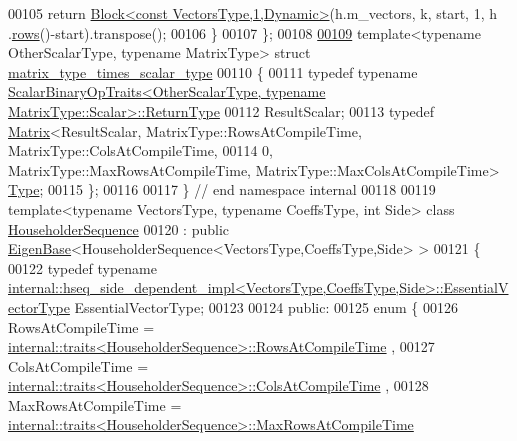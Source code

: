 \begin{DoxyCode}
00105     \textcolor{keywordflow}{return} \hyperlink{group___core___module_class_eigen_1_1_block}{Block<const VectorsType,1,Dynamic>}(h.m\_vectors, k, start, 1, h
      .\hyperlink{group___householder___module_a6eaafe2460930d1f4aa67d6e577b71f0}{rows}()-start).transpose();
00106   \}
00107 \};
00108 
\hyperlink{struct_eigen_1_1internal_1_1matrix__type__times__scalar__type}{00109} \textcolor{keyword}{template}<\textcolor{keyword}{typename} OtherScalarType, \textcolor{keyword}{typename} MatrixType> \textcolor{keyword}{struct }
      \hyperlink{struct_eigen_1_1internal_1_1matrix__type__times__scalar__type}{matrix\_type\_times\_scalar\_type}
00110 \{
00111   \textcolor{keyword}{typedef} \textcolor{keyword}{typename} 
      \hyperlink{group___core___module_struct_eigen_1_1_scalar_binary_op_traits}{ScalarBinaryOpTraits<OtherScalarType, typename MatrixType::Scalar>::ReturnType}
00112     ResultScalar;
00113   \textcolor{keyword}{typedef} \hyperlink{group___core___module_class_eigen_1_1_matrix}{Matrix}<ResultScalar, MatrixType::RowsAtCompileTime, MatrixType::ColsAtCompileTime,
00114                  0, MatrixType::MaxRowsAtCompileTime, MatrixType::MaxColsAtCompileTime> 
      \hyperlink{group___core___module_class_eigen_1_1_matrix}{Type};
00115 \};
00116 
00117 \} \textcolor{comment}{// end namespace internal}
00118 
00119 \textcolor{keyword}{template}<\textcolor{keyword}{typename} VectorsType, \textcolor{keyword}{typename} CoeffsType, \textcolor{keywordtype}{int} S\textcolor{keywordtype}{id}e> \textcolor{keyword}{class }
      \hyperlink{group___householder___module_class_eigen_1_1_householder_sequence}{HouseholderSequence}
00120   : \textcolor{keyword}{public} \hyperlink{group___core___module_struct_eigen_1_1_eigen_base}{EigenBase}<HouseholderSequence<VectorsType,CoeffsType,Side> >
00121 \{
00122     \textcolor{keyword}{typedef} \textcolor{keyword}{typename} 
      \hyperlink{group___core___module_class_eigen_1_1_block}{internal::hseq\_side\_dependent\_impl<VectorsType,CoeffsType,Side>::EssentialVectorType}
       EssentialVectorType;
00123   
00124   \textcolor{keyword}{public}:
00125     \textcolor{keyword}{enum} \{
00126       RowsAtCompileTime = 
      \hyperlink{struct_eigen_1_1internal_1_1traits}{internal::traits<HouseholderSequence>::RowsAtCompileTime}
      ,
00127       ColsAtCompileTime = 
      \hyperlink{struct_eigen_1_1internal_1_1traits}{internal::traits<HouseholderSequence>::ColsAtCompileTime}
      ,
00128       MaxRowsAtCompileTime = 
      \hyperlink{struct_eigen_1_1internal_1_1traits}{internal::traits<HouseholderSequence>::MaxRowsAtCompileTime}

\end{DoxyCode}
